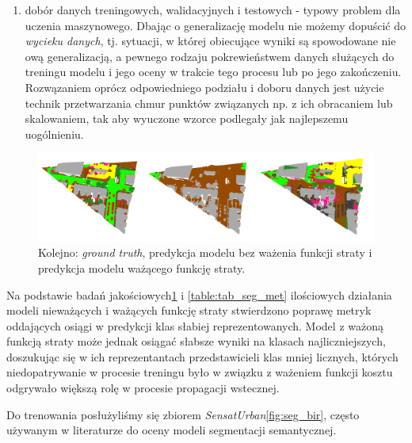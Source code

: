 \begin{enumerate}
\begin{enumerate}
    \end{enumerate}
    \item dobór danych treningowych, walidacyjnych i testowych - typowy problem dla uczenia maszynowego. Dbając o generalizację modelu nie możemy dopuścić do \textit{wycieku danych}, tj. sytuacji, w której obiecujące wyniki są spowodowane nie ową generalizacją, a pewnego rodzaju pokrewieństwem danych służących do treningu modelu i jego oceny w trakcie tego procesu lub po jego zakończeniu. Rozwązaniem oprócz odpowiedniego podziału i doboru danych jest użycie technik przetwarzania chmur punktów związanych np. z ich obracaniem lub skalowaniem, tak aby wyuczone wzorce podlegały jak najlepszemu uogólnieniu.
\end{enumerate}

\begin{figure}[!h]
    \centering
    \includegraphics[width=1.0\linewidth]{img/segmentacja/weighted_loss.png}
    \caption{Kolejno: \textit{ground truth}, predykcja modelu bez ważenia funkcji straty i predykcja modelu ważącego funkcję straty.}
    \label{fig:seg_wei}
\end{figure}

Na podstawie badań jakościowych\ref{fig:seg_wei} i \ref{table:tab_seg_met} ilościowych działania modeli nieważących i ważących funkcję straty stwierdzono poprawę metryk oddających osiągi w predykcji klas słabiej reprezentowanych. Model z ważoną funkcją straty może jednak osiągać słabsze wyniki na klasach najliczniejszych, doszukując się w ich reprezentantach przedstawicieli klas mniej licznych, których niedopatrywanie w procesie treningu było w związku z ważeniem funkcji kosztu odgrywało większą rolę w procesie propagacji wstecznej.

Do trenowania posłużyliśmy się zbiorem \textit{SensatUrban}\cite{hu2022sensaturban}\ref{fig:seg_bir}, często używanym w literaturze do oceny modeli segmentacji semantycznej.

